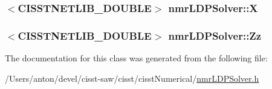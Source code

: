 \subsubsection[{X}]{$<$C\+I\+S\+S\+T\+N\+E\+T\+L\+I\+B\+\_\+\+D\+O\+U\+B\+L\+E$>$ nmr\+L\+D\+P\+Solver\+::\+X\hspace{0.3cm}{\ttfamily [protected]}}\label{classnmr_l_d_p_solver_a5868c434e5fef304f43ea90e8202d897}
\hypertarget{classnmr_l_d_p_solver_ab8b43ef98ca002bfc8d3b6ad4e6ac654}{}
\subsubsection[{Zz}]{$<$C\+I\+S\+S\+T\+N\+E\+T\+L\+I\+B\+\_\+\+D\+O\+U\+B\+L\+E$>$ nmr\+L\+D\+P\+Solver\+::\+Zz\hspace{0.3cm}{\ttfamily [protected]}}\label{classnmr_l_d_p_solver_ab8b43ef98ca002bfc8d3b6ad4e6ac654}


The documentation for this class was generated from the following file\+:\begin{DoxyCompactItemize}
\item 
/\+Users/anton/devel/cisst-\/saw/cisst/cisst\+Numerical/\hyperlink{nmr_l_d_p_solver_8h}{nmr\+L\+D\+P\+Solver.\+h}\end{DoxyCompactItemize}
